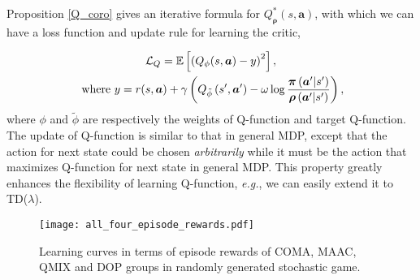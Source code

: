 \documentclass{article}
\begin{document}
Proposition \ref{Q_coro} gives an iterative formula for $Q^*_{\bm{\rho}}(s,\bm{a})$, with which we can have a loss function and update rule for learning the critic,
\iffalse
\begin{equation}
	\mathcal{L}_{Q}=\mathbb{E}\left[\left(Q_{\phi}(s, \boldsymbol{a})-y\right)^{2}\right], %
	\text{ where } y=r(s, \boldsymbol{a})+ \gamma \left(Q_{\tilde{\phi}}\left(s^{\prime}, \boldsymbol{a}^{\prime}\right)-\omega \log \frac{\boldsymbol{\pi}\left( \boldsymbol{a}^{\prime}|s^{\prime}\right)}{\boldsymbol{\rho}\left( \boldsymbol{a}^{\prime}|s^{\prime}\right)} \right), \label{Q-loss2} \\
\end{equation}
\fi
\begin{gather*}
	\mathcal{L}_{Q}=\mathbb{E}\left[\left(Q_{\phi}(s, \boldsymbol{a})-y\right)^{2}\right], \\ %
	\text{ where } y=r(s, \boldsymbol{a})+ \gamma \left(Q_{\tilde{\phi}}\left(s^{\prime}, \boldsymbol{a}^{\prime}\right)-\omega \log \frac{\boldsymbol{\pi}\left( \boldsymbol{a}^{\prime}|s^{\prime}\right)}{\boldsymbol{\rho}\left( \boldsymbol{a}^{\prime}|s^{\prime}\right)} \right), \label{Q-loss2} \notag
\end{gather*}
where $\phi$ and $\tilde{\phi}$ are respectively the weights of Q-function and target Q-function.%
The update of Q-function is similar to that in general MDP, except that the action for next state could be chosen \textit{arbitrarily} while it must be the action that maximizes Q-function for next state in general MDP. This property greatly enhances the flexibility of learning Q-function, \textit{e.g.}, we can easily extend it to TD($\lambda$).

\begin{figure*}[t]
	\centering
	\texttt{[image: all\_four\_episode\_rewards.pdf]}
	\vspace*{-0.7cm}
	\caption{Learning curves in terms of episode rewards of COMA, MAAC, QMIX and DOP groups in randomly generated stochastic game.}
	\label{matrix-four}
	\vspace*{-0.2cm}
\end{figure*}
\end{document}
